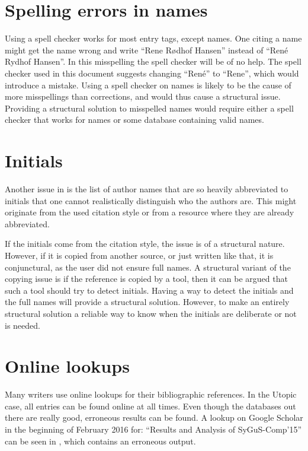 \section{Spelling errors in names}
\label{sec:problems_spelling_names}

Using a spell checker works for most entry tags, except names.  One
citing a name might get the name wrong and write ``Rene Rødhof
Hansen'' instead of ``René Rydhof Hansen''.  In this misspelling the
spell checker will be of no help.  The spell checker used in this
document suggests changing ``René'' to ``Rene'', which would introduce
a mistake.  Using a spell checker on names is likely to be the cause
of more misspellings than corrections, and would thus cause a
structural issue.  Providing a structural solution to misspelled names
would require either a spell checker that works for names or some
database containing valid names.


\section{Initials}
\label{sec:problems_initials}

Another issue in  is the list of author
names that are so heavily abbreviated to initials that one cannot
realistically distinguish who the authors are.  This might originate
from the used citation style or from a resource where they are already
abbreviated.

If the initials come from the citation style, the issue is of a
structural nature.  However, if it is copied from another source, or
just written like that, it is conjunctural, as the user did not ensure
full names.  A structural variant of the copying issue is if the
reference is copied by a tool, then it can be argued that such a tool
should try to detect initials.  Having a way to detect the initials
and the full names will provide a structural solution.  However, to
make an entirely structural solution a reliable way to know when the
initials are deliberate or not is needed.


\section{Online lookups}
\label{sec:problems_look_ups}

Many writers use online lookups for their bibliographic references.
In the Utopic case, all entries can be found online at all times.
Even though the databases out there are really good, erroneous results
can be found.  A lookup on Google Scholar in the beginning of February
2016 for: ``Results and Analysis of SyGuS-Comp’15'' can be seen in
, which contains an erroneous output.

